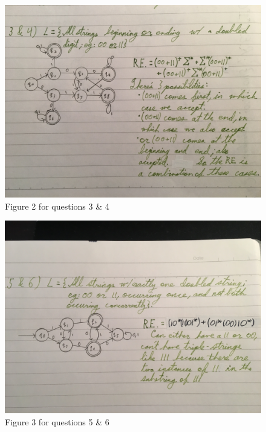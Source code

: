 \documentclass{article}
\begin{document}
\begin{enumerate}
\begin{figure}[b!]
  \end{figure}
  
  \begin{figure}[b!]
  
  	\includegraphics[width=\linewidth]{Math043&4}
  	\caption{Figure 2 for questions 3 \& 4}

  \end{figure}
  
  \begin{figure}[b!]
  
  	\includegraphics[width=\linewidth]{Math045&6}
  	\caption{Figure 3 for questions 5 \& 6}

  \end{figure}


\end{enumerate}
\end{document}
